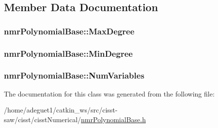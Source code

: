 \subsection{Member Data Documentation}
\hypertarget{classnmr_polynomial_base_a33e3c6f203860a795be32d558fa05330}{
\subsubsection[{Max\-Degree}]{ nmr\-Polynomial\-Base\-::\-Max\-Degree\hspace{0.3cm}{\ttfamily [protected]}}}\label{classnmr_polynomial_base_a33e3c6f203860a795be32d558fa05330}
\hypertarget{classnmr_polynomial_base_a3380544a94773195706d04b22801cd6c}{
\subsubsection[{Min\-Degree}]{ nmr\-Polynomial\-Base\-::\-Min\-Degree\hspace{0.3cm}{\ttfamily [protected]}}}\label{classnmr_polynomial_base_a3380544a94773195706d04b22801cd6c}
\hypertarget{classnmr_polynomial_base_ac8dad4ccf2d740abc1f4d3afe8e10cd2}{
\subsubsection[{Num\-Variables}]{ nmr\-Polynomial\-Base\-::\-Num\-Variables\hspace{0.3cm}{\ttfamily [protected]}}}\label{classnmr_polynomial_base_ac8dad4ccf2d740abc1f4d3afe8e10cd2}


The documentation for this class was generated from the following file\-:\begin{DoxyCompactItemize}
\item 
/home/adeguet1/catkin\-\_\-ws/src/cisst-\/saw/cisst/cisst\-Numerical/\hyperlink{nmr_polynomial_base_8h}{nmr\-Polynomial\-Base.\-h}\end{DoxyCompactItemize}
